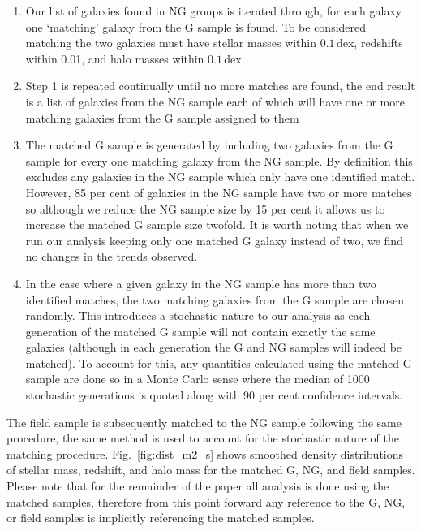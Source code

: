 \documentclass[a4paper,fleqn,usenatbib]{mnras}
\begin{document}
\begin{enumerate}
  \item Our list of galaxies found in NG groups is iterated through,
    for each galaxy one `matching' galaxy from the G sample is
    found.  To be considered matching the two galaxies must have
    stellar masses within $0.1\,\mathrm{dex}$, redshifts within 0.01,
    and halo masses within $0.1\,\mathrm{dex}$.

  \item Step 1 is repeated continually until no more matches are
    found, the end result is a list of galaxies from the NG
    sample each of which will have one or more matching galaxies from
    the G sample assigned to them
  
  \item The matched G sample is generated by including two galaxies
    from the G sample for every one matching galaxy from the NG
    sample.  By definition this excludes any galaxies in the NG
    sample which only have one identified match.  However, 85 per cent
    of galaxies
    in the NG sample have two or more matches so although we reduce
    the NG sample size by 15 per cent it allows us to increase the
    matched G sample size twofold.  It is worth noting that when we
    run our analysis keeping only one matched G galaxy instead of two,
    we find no changes in the trends observed.

  \item In the case where a given galaxy in the NG sample has more
    than two identified matches, the two matching galaxies from the G sample are
    chosen randomly.  This introduces a stochastic nature to our
    analysis as each generation of the matched G sample will not
    contain exactly the same galaxies (although in each generation the
    G and NG samples will indeed be matched).  To account for this, any
    quantities calculated using the matched G sample are done so in a
    Monte Carlo sense where the median of 1000 stochastic generations
    is quoted along with 90 per cent confidence intervals.
\end{enumerate}

\noindent
The field sample is subsequently matched to the NG sample following
the same procedure, the same method is used to account for the
stochastic nature of the matching procedure.  Fig.~\ref{fig:dist_m2_s}
shows smoothed density
distributions of stellar mass, redshift, and halo mass for the matched
G, NG, and field samples.  Please note that for the remainder of the
paper all analysis is done using the matched samples, therefore from
this point forward any reference to the G, NG, or field samples is
implicitly referencing the matched samples.
\end{document}

